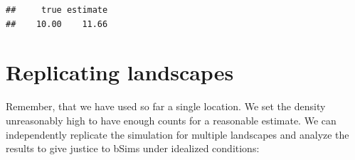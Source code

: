 \documentclass[12pt,]{book}
\newenvironment{Shaded}{\begin{snugshade}}{\end{snugshade}}
\newcommand{\ControlFlowTok}[1]{\textcolor[rgb]{0.13,0.29,0.53}{\textbf{#1}}}
\newcommand{\DataTypeTok}[1]{\textcolor[rgb]{0.13,0.29,0.53}{#1}}
\newcommand{\DecValTok}[1]{\textcolor[rgb]{0.00,0.00,0.81}{#1}}
\newcommand{\FloatTok}[1]{\textcolor[rgb]{0.00,0.00,0.81}{#1}}
\newcommand{\KeywordTok}[1]{\textcolor[rgb]{0.13,0.29,0.53}{\textbf{#1}}}
\newcommand{\NormalTok}[1]{#1}
\newcommand{\OperatorTok}[1]{\textcolor[rgb]{0.81,0.36,0.00}{\textbf{#1}}}
\newcommand{\OtherTok}[1]{\textcolor[rgb]{0.56,0.35,0.01}{#1}}
\newcommand{\StringTok}[1]{\textcolor[rgb]{0.31,0.60,0.02}{#1}}
\begin{document}
\begin{verbatim}
##     true estimate 
##    10.00    11.66
\end{verbatim}

\hypertarget{replicating-landscapes}{%
\section{Replicating landscapes}\label{replicating-landscapes}}

Remember, that we have used so far a single location.
We set the density unreasonably high to have enough counts
for a reasonable estimate.
We can independently replicate the simulation for multiple
landscapes and analyze the results to give justice to bSims
under idealized conditions:

\begin{Shaded}
\end{Shaded}
\end{document}
